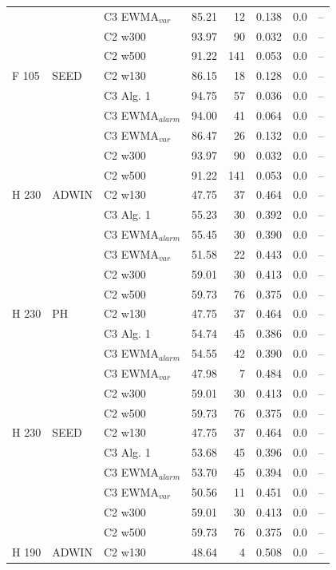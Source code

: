 \begin{longtable}{lllrrrrr}
 &  & C3 EWMA$_{var}$ & 85.21 & 12 & 0.138 & 0.0 & -- \\
 &  & C2 w300 & 93.97 & 90 & 0.032 & 0.0 & -- \\
 &  & C2 w500 & 91.22 & 141 & 0.053 & 0.0 & -- \\
\hline
F  105 & SEED & C2 w130 & 86.15 & 18 & 0.128 & 0.0 & -- \\
 &  & C3 Alg. 1 & 94.75 & 57 & 0.036 & 0.0 & -- \\
 &  & C3 EWMA$_{alarm}$ & 94.00 & 41 & 0.064 & 0.0 & -- \\
 &  & C3 EWMA$_{var}$ & 86.47 & 26 & 0.132 & 0.0 & -- \\
 &  & C2 w300 & 93.97 & 90 & 0.032 & 0.0 & -- \\
 &  & C2 w500 & 91.22 & 141 & 0.053 & 0.0 & -- \\
\hline
H  230 & ADWIN & C2 w130 & 47.75 & 37 & 0.464 & 0.0 & -- \\
 &  & C3 Alg. 1 & 55.23 & 30 & 0.392 & 0.0 & -- \\
 &  & C3 EWMA$_{alarm}$ & 55.45 & 30 & 0.390 & 0.0 & -- \\
 &  & C3 EWMA$_{var}$ & 51.58 & 22 & 0.443 & 0.0 & -- \\
 &  & C2 w300 & 59.01 & 30 & 0.413 & 0.0 & -- \\
 &  & C2 w500 & 59.73 & 76 & 0.375 & 0.0 & -- \\
\hline
H  230 & PH & C2 w130 & 47.75 & 37 & 0.464 & 0.0 & -- \\
 &  & C3 Alg. 1 & 54.74 & 45 & 0.386 & 0.0 & -- \\
 &  & C3 EWMA$_{alarm}$ & 54.55 & 42 & 0.390 & 0.0 & -- \\
 &  & C3 EWMA$_{var}$ & 47.98 & 7 & 0.484 & 0.0 & -- \\
 &  & C2 w300 & 59.01 & 30 & 0.413 & 0.0 & -- \\
 &  & C2 w500 & 59.73 & 76 & 0.375 & 0.0 & -- \\
\hline
H  230 & SEED & C2 w130 & 47.75 & 37 & 0.464 & 0.0 & -- \\
 &  & C3 Alg. 1 & 53.68 & 45 & 0.396 & 0.0 & -- \\
 &  & C3 EWMA$_{alarm}$ & 53.70 & 45 & 0.394 & 0.0 & -- \\
 &  & C3 EWMA$_{var}$ & 50.56 & 11 & 0.451 & 0.0 & -- \\
 &  & C2 w300 & 59.01 & 30 & 0.413 & 0.0 & -- \\
 &  & C2 w500 & 59.73 & 76 & 0.375 & 0.0 & -- \\
\hline
H  190 & ADWIN & C2 w130 & 48.64 & 4 & 0.508 & 0.0 & -- \\

\end{longtable}

